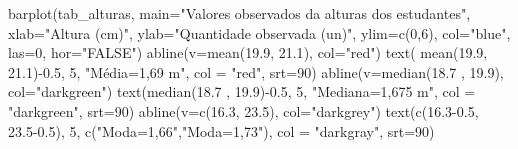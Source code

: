 \documentclass[
]{book}
\newenvironment{Shaded}{\begin{snugshade}}{\end{snugshade}}
\newcommand{\AttributeTok}[1]{\textcolor[rgb]{0.77,0.63,0.00}{#1}}
\newcommand{\DecValTok}[1]{\textcolor[rgb]{0.00,0.00,0.81}{#1}}
\newcommand{\FloatTok}[1]{\textcolor[rgb]{0.00,0.00,0.81}{#1}}
\newcommand{\FunctionTok}[1]{\textcolor[rgb]{0.00,0.00,0.00}{#1}}
\newcommand{\NormalTok}[1]{#1}
\newcommand{\SpecialCharTok}[1]{\textcolor[rgb]{0.00,0.00,0.00}{#1}}
\newcommand{\StringTok}[1]{\textcolor[rgb]{0.31,0.60,0.02}{#1}}
\begin{document}
\begin{Shaded}
\begin{Highlighting}[]
\FunctionTok{barplot}\NormalTok{(tab\_alturas,}
        \AttributeTok{main=}\StringTok{"Valores observados da alturas dos estudantes"}\NormalTok{,}
        \AttributeTok{xlab=}\StringTok{"Altura (cm)"}\NormalTok{,}
        \AttributeTok{ylab=}\StringTok{"Quantidade observada (un)"}\NormalTok{,}
        \AttributeTok{ylim=}\FunctionTok{c}\NormalTok{(}\DecValTok{0}\NormalTok{,}\DecValTok{6}\NormalTok{),}
        \AttributeTok{col=}\StringTok{"blue"}\NormalTok{,}
        \AttributeTok{las=}\DecValTok{0}\NormalTok{, }
        \AttributeTok{hor=}\StringTok{"FALSE"}\NormalTok{)}
\FunctionTok{abline}\NormalTok{(}\AttributeTok{v=}\FunctionTok{mean}\NormalTok{(}\FloatTok{19.9}\NormalTok{, }\FloatTok{21.1}\NormalTok{), }\AttributeTok{col=}\StringTok{"red"}\NormalTok{)}
\FunctionTok{text}\NormalTok{( }\FunctionTok{mean}\NormalTok{(}\FloatTok{19.9}\NormalTok{, }\FloatTok{21.1}\NormalTok{)}\SpecialCharTok{{-}}\FloatTok{0.5}\NormalTok{, }\DecValTok{5}\NormalTok{, }\StringTok{"Média=1,69 m"}\NormalTok{, }\AttributeTok{col =} \StringTok{"red"}\NormalTok{, }\AttributeTok{srt=}\DecValTok{90}\NormalTok{)}
\FunctionTok{abline}\NormalTok{(}\AttributeTok{v=}\FunctionTok{median}\NormalTok{(}\FloatTok{18.7}\NormalTok{ , }\FloatTok{19.9}\NormalTok{), }\AttributeTok{col=}\StringTok{"darkgreen"}\NormalTok{) }
\FunctionTok{text}\NormalTok{(}\FunctionTok{median}\NormalTok{(}\FloatTok{18.7}\NormalTok{ , }\FloatTok{19.9}\NormalTok{)}\SpecialCharTok{{-}}\FloatTok{0.5}\NormalTok{, }\DecValTok{5}\NormalTok{, }\StringTok{"Mediana=1,675 m"}\NormalTok{, }\AttributeTok{col =} \StringTok{"darkgreen"}\NormalTok{, }\AttributeTok{srt=}\DecValTok{90}\NormalTok{)}
\FunctionTok{abline}\NormalTok{(}\AttributeTok{v=}\FunctionTok{c}\NormalTok{(}\FloatTok{16.3}\NormalTok{, }\FloatTok{23.5}\NormalTok{), }\AttributeTok{col=}\StringTok{"darkgrey"}\NormalTok{) }
\FunctionTok{text}\NormalTok{(}\FunctionTok{c}\NormalTok{(}\FloatTok{16.3{-}0.5}\NormalTok{, }\FloatTok{23.5{-}0.5}\NormalTok{), }\DecValTok{5}\NormalTok{, }\FunctionTok{c}\NormalTok{(}\StringTok{"Moda=1,66"}\NormalTok{,}\StringTok{"Moda=1,73"}\NormalTok{), }\AttributeTok{col =} \StringTok{"darkgray"}\NormalTok{, }\AttributeTok{srt=}\DecValTok{90}\NormalTok{)}
\end{Highlighting}
\end{Shaded}
\end{document}
